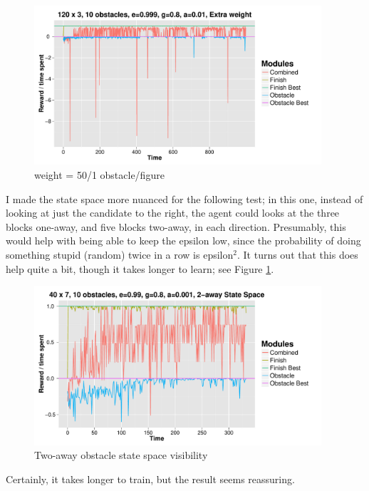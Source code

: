 \documentclass[11pt]{report}
\begin{document}
\begin{figure}[H]
  \centering
  \includegraphics[width=0.95\textwidth]{results/qlearn-s120x3-o10-w50.pdf}
  \caption{weight = 50/1 obstacle/figure}
\end{figure}

I made the state space more nuanced for the following test; in this one, instead of looking at just the candidate to the right, the agent could looks at the three blocks one-away, and five blocks two-away, in each direction. Presumably, this would help with being able to keep the epsilon low, since the probability of doing something stupid (random) twice in a row is epsilon$^2$. It turns out that this does help quite a bit, though it takes longer to learn; see Figure \ref{fig:two-away}.

\begin{figure}[H]
  \centering
  \includegraphics[width=0.95\textwidth]{results/qlearn-s40x7-o10-e99-directions.pdf}
  \caption{Two-away obstacle state space visibility}
  \label{fig:two-away}
\end{figure}

Certainly, it takes longer to train, but the result seems reassuring.
\end{document}
